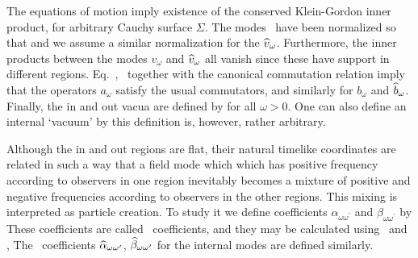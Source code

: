 The equations of motion imply existence of
the conserved
Klein-Gordon inner product,
%
\eqn{}
%
for arbitrary Cauchy surface $\Sigma$.  The modes \modes\ have been
normalized so that
%
\eqn{}
%
and we assume a similar normalization for the ${\widehat v}_\omega$.
Furthermore, the inner products between the modes $v_\omega$ and
${\widehat v}_\omega$ all vanish since these have support in different regions.
Eq.~\mlexp, \normcond\ together with the canonical commutation relation
%
\eqn{}
%
imply that the operators $a_{\omega}$ %
satisfy the usual commutators,
%
\eqn\ccr{
[a_{\omega},\aopdag ]%
= \delta(\omega - \omega^{\prime})\ ,\
 [a_{\omega},a_{\omega^{\prime}}]=0\ ,\
[\aodag,\aopdag]=0\ ,
}
%
and similarly for $b_\omega$ and ${\widehat b}_\omega$.
Finally, the in and out vacua are defined by
%
\eqn{}
%
for all $\omega>0$.  One can also define
an internal `vacuum' by
%
\eqn{}
%
this definition is, however, rather arbitrary.

Although the in and out regions are flat, their natural timelike coordinates
 are related in such a way that a field mode which
which has positive frequency according to observers in one region
inevitably becomes a mixture of positive and negative frequencies
according to observers in the other regions.  This mixing is interpreted as
particle creation.
To study it we define coefficients $\alpha_{\omega\omega^{'}}$
and $\beta_{\omega\omega^{'}}$ by
%
\eqn\bogdef{ v_{\omega} =\int_{0}^{\infty}d\omega' \lbrack
  \alpha_{\omega\omega^{'}} u_{\omega^{'}}
 +\beta_{\omega\omega^{'}} u^{*}_{\omega^{'}} \rbrack .}
%
These coefficients are called \Bog\ coefficients, and they may be
calculated using \normcond\ and \bogdef,
%
\eqn\bogc{\alpha_{\omega\omega^{\prime}} =\otp (v_{\omega},
                         u_{\omega^{\prime}})\quad ,\quad
\beta_{\omega\omega^\prime} = -\otp(v_{\omega},
                         {u}_{\omega^{\prime}}^*)\ .}
%
The \Bog\ coefficients ${\widehat \alpha}_{\omega\omega'}$,
${\widehat \beta}_{\omega\omega'}$ for the internal modes are defined similarly.

